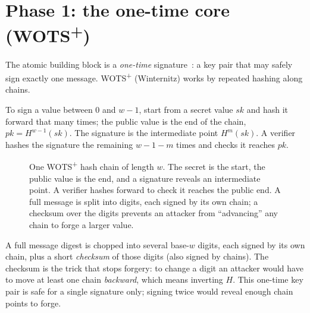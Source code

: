 \section{Phase 1: the one-time core (WOTS\textsuperscript{+})}

The atomic building block is a \emph{one-time} signature~\cite{lamport1979}: a key pair that may safely sign exactly one message. WOTS\textsuperscript{+} (Winternitz) works by repeated hashing along chains.

To sign a value between $0$ and $w-1$, start from a secret value $sk$ and hash it forward that many times; the public value is the end of the chain, $pk = H^{w-1}(sk)$. The signature is the intermediate point $H^{m}(sk)$. A verifier hashes the signature the remaining $w-1-m$ times and checks it reaches $pk$.

\begin{figure}[H]
\centering
{}
\caption{One WOTS\textsuperscript{+} hash chain of length $w$. The secret is the start, the public value is the end, and a signature reveals an intermediate point. A verifier hashes forward to check it reaches the public end. A full message is split into digits, each signed by its own chain; a checksum over the digits prevents an attacker from ``advancing'' any chain to forge a larger value.}
\label{fig:wots-chain}
\end{figure}

A full message digest is chopped into several base-$w$ digits, each signed by its own chain, plus a short \emph{checksum} of those digits (also signed by chains). The checksum is the trick that stops forgery: to change a digit an attacker would have to move at least one chain \emph{backward}, which means inverting $H$. This one-time key pair is safe for a single signature only; signing twice would reveal enough chain points to forge.

